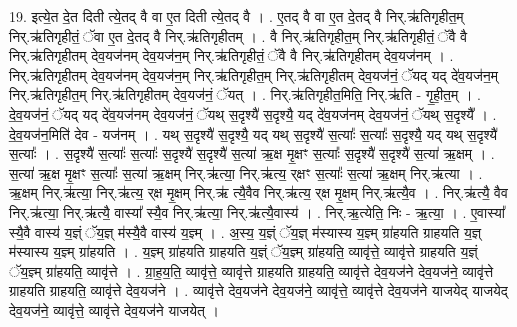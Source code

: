 \documentclass[17pt]{extarticle}
\begin{document}
19. इत्ये॒त दे॒त दिती त्ये॒तद् वै वा ए॒त दिती त्ये॒तद् वै । . ए॒तद् वै वा ए॒त दे॒तद् वै निर्.ऋ॑तिगृहीत॒म् निर्.ऋ॑तिगृहीतं॒ ॅवा ए॒त दे॒तद् वै निर्.ऋ॑तिगृहीतम् । . वै निर्.ऋ॑तिगृहीत॒म् निर्.ऋ॑तिगृहीतं॒ ॅवै वै निर्.ऋ॑तिगृहीतम् देव॒यज॑नम् देव॒यज॑न॒म् निर्.ऋ॑तिगृहीतं॒ ॅवै वै निर्.ऋ॑तिगृहीतम् देव॒यज॑नम् । . निर्.ऋ॑तिगृहीतम् देव॒यज॑नम् देव॒यज॑न॒म् निर्.ऋ॑तिगृहीत॒म् निर्.ऋ॑तिगृहीतम् देव॒यज॑नं॒ ॅयद् यद् दे॑व॒यज॑न॒म् निर्.ऋ॑तिगृहीत॒म् निर्.ऋ॑तिगृहीतम् देव॒यज॑नं॒ ॅयत् । . निर्.ऋ॑तिगृहीत॒मिति॒ निर्.ऋ॑ति - गृ॒ही॒त॒म् । . दे॒व॒यज॑नं॒ ॅयद् यद् दे॑व॒यज॑नम् देव॒यज॑नं॒ ॅयथ् स॒दृश्यै॑ स॒दृश्यै॒ यद् दे॑व॒यज॑नम् देव॒यज॑नं॒ ॅयथ् स॒दृश्यै᳚ । . दे॒व॒यज॑न॒मिति॑ देव - यज॑नम् । . यथ् स॒दृश्यै॑ स॒दृश्यै॒ यद् यथ् स॒दृश्यै॑ स॒त्याः᳚ स॒त्याः᳚ स॒दृश्यै॒ यद् यथ् स॒दृश्यै॑ स॒त्याः᳚ । . स॒दृश्यै॑ स॒त्याः᳚ स॒त्याः᳚ स॒दृश्यै॑ स॒दृश्यै॑ स॒त्या॑ ऋ॒क्ष मृ॒क्षꣳ स॒त्याः᳚ स॒दृश्यै॑ स॒दृश्यै॑ स॒त्या॑ ऋ॒क्षम् । . स॒त्या॑ ऋ॒क्ष मृ॒क्षꣳ स॒त्याः᳚ स॒त्या॑ ऋ॒क्षम् निर्.ऋ॑त्या॒ निर्.ऋ॑त्य॒ र्‌क्षꣳ स॒त्याः᳚ स॒त्या॑ ऋ॒क्षम् निर्.ऋ॑त्या । . ऋ॒क्षम् निर्.ऋ॑त्या॒ निर्.ऋ॑त्य॒ र्‌क्ष मृ॒क्षम् निर्.ऋ॑ त्यै॒वैव निर्.ऋ॑त्य॒ र्‌क्ष मृ॒क्षम् निर्.ऋ॑त्यै॒व । . निर्.ऋ॑त्यै॒ वैव निर्.ऋ॑त्या॒ निर्.ऋ॑त्यै॒ वास्या᳚ स्यै॒व निर्.ऋ॑त्या॒ निर्.ऋ॑त्यै॒वास्य॑ । . निर्.ऋ॒त्येति॒ निः - ऋ॒त्या॒ । . ए॒वास्या᳚ स्यै॒वै वास्य॑ य॒ज्ञ्ं ॅय॒ज्ञ् म॑स्यै॒वै वास्य॑ य॒ज्ञ्म् । . अ॒स्य॒ य॒ज्ञ्ं ॅय॒ज्ञ् म॑स्यास्य य॒ज्ञ्म् ग्रा॑हयति ग्राहयति य॒ज्ञ् म॑स्यास्य य॒ज्ञ्म् ग्रा॑हयति । . य॒ज्ञ्म् ग्रा॑हयति ग्राहयति य॒ज्ञ्ं ॅय॒ज्ञ्म् ग्रा॑हयति॒ व्यावृ॑त्ते॒ व्यावृ॑त्ते ग्राहयति य॒ज्ञ्ं ॅय॒ज्ञ्म् ग्रा॑हयति॒ व्यावृ॑त्ते । . ग्रा॒ह॒य॒ति॒ व्यावृ॑त्ते॒ व्यावृ॑त्ते ग्राहयति ग्राहयति॒ व्यावृ॑त्ते देव॒यज॑ने देव॒यज॑ने॒ व्यावृ॑त्ते ग्राहयति ग्राहयति॒ व्यावृ॑त्ते देव॒यज॑ने । . व्यावृ॑त्ते देव॒यज॑ने देव॒यज॑ने॒ व्यावृ॑त्ते॒ व्यावृ॑त्ते देव॒यज॑ने याजयेद् याजयेद् देव॒यज॑ने॒ व्यावृ॑त्ते॒ व्यावृ॑त्ते देव॒यज॑ने याजयेत् । \newline
\end{document}
